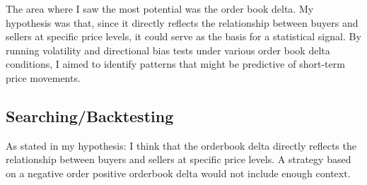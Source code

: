 \documentclass[12pt]{article}
\begin{document}
The area where I saw the most potential was the order book delta. My hypothesis was that, since it directly reflects the relationship between buyers and sellers at specific price levels, it could serve as the basis for a statistical signal. By running volatility and directional bias tests under various order book delta conditions, I aimed to identify patterns that might be predictive of short-term price movements.






\newpage

\subsection{Searching/Backtesting}
As stated in my hypothesis: I think that the orderbook delta directly reflects the relationship between buyers and sellers at specific price levels. A strategy based on a negative order positive orderbook delta would not include enough context.
\end{document}
